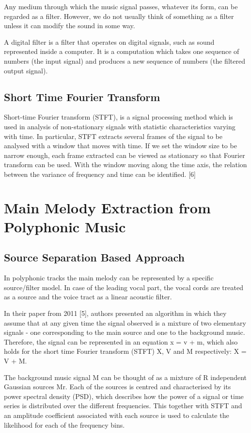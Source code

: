 Any medium through which the music signal passes, whatever its form, can be regarded as a filter. However, we do not usually think of something as a filter unless it can modify the sound in some way. 

A digital filter is a filter that operates on digital signals, such as sound represented inside a computer. It is a computation which takes one sequence of numbers (the input signal) and produces a new sequence of numbers (the filtered output signal). 


\subsection{Short Time Fourier Transform}

Short-time Fourier transform (STFT), is a signal processing method which is used in analysis of non-stationary signals with statistic characteristics varying with time.
In particular, STFT extracts several frames of the signal to be analysed with a window that moves with time. If we set the window size to be narrow enough, each frame extracted can be viewed as stationary so that Fourier transform can be used. With the window moving along the time axis, the relation between the variance of frequency and time can be identified. [6]


\section{Main Melody Extraction from Polyphonic Music}

\subsection{Source Separation Based Approach}


In polyphonic tracks the main melody can be represented by a specific source/filter model. In case of the leading vocal part, the vocal cords are treated as a source and the voice tract as a linear acoustic filter.

In their paper from 2011 [5], authors presented an algorithm in which they assume that at any given time the signal observed is a mixture of two elementary signals - one corresponding to the main source and one to the background music. Therefore, the signal can be represented in an equation x = v + m, which also holds for the short time Fourier transform (STFT)  X, V and M respectively: X = V + M. 

The background music signal M can be thought of as a mixture of R independent Gaussian sources Mr. 
Each of the sources is centred and characterised by its power spectral density (PSD), which describes how the power of a signal or time series is distributed over the different frequencies. This together with STFT and an amplitude coefficient associated with each source is used to calculate the likelihood  for each of the frequency bins.

